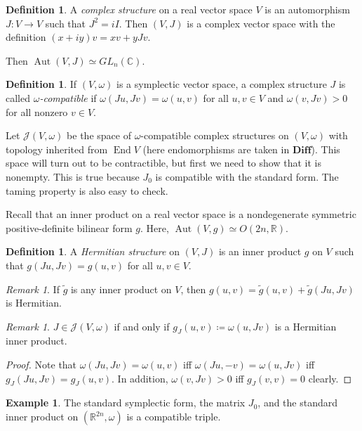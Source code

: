 \documentclass[leqno, openany]{memoir}
\theoremstyle{definition}
\newtheorem{defn}[thm]{Definition}
\newtheorem{exm}[thm]{Example}
\theoremstyle{remark}
\newtheorem{rmk}[thm]{Remark}
\theoremstyle{plain}
\theoremstyle{definition}
\theoremstyle{remark}
\newcommand{\R}{\mathbb{R}}
\newcommand{\C}{\mathbb{C}}
\newcommand{\mc}[1]{\mathcal{#1}}
\DeclareMathOperator{\End}{End}
\DeclareMathOperator{\Aut}{Aut}
\begin{document}
\begin{defn} A \textit{complex structure} on a real vector space $V$ is an
automorphism $J: V \to V$ such that $J^2 = iI$. Then $(V, J)$ is a complex
vector space with the definition $(x+iy) v = x v + yJv$.  \end{defn} Then
$\Aut(V, J) \simeq GL_n(\C)$.

\begin{defn} If $(V, \omega)$ is a symplectic vector space, a complex structure
$J$ is called \textit{$\omega$-compatible} if $\omega(Ju, Jv) = \omega(u,v)$
for all $u,v \in V$ and $\omega(v, Jv) > 0$ for all nonzero $v \in V$.
\end{defn} Let $\mc{J}(V, \omega)$ be the space of $\omega$-compatible complex
structures on $(V, \omega)$ with topology inherited from $\End V$ (here
endomorphisms are taken in $\mathbf{Diff}$). This space will turn out to be
contractible, but first we need to show that it is nonempty. This is true
because $J_0$ is compatible with the standard form. The taming property is also
easy to check.

Recall that an inner product on a real vector space is a nondegenerate
symmetric positive-definite bilinear form $g$. Here, $\Aut(V,g) \simeq O(2n,
\R)$.  \begin{defn} A \textit{Hermitian structure} on $(V,J)$ is an inner
    product $g$ on $V$ such that $g(Ju, Jv) = g(u, v)$ for all $u,v \in V$.
\end{defn}

\begin{rmk} If $\widetilde{g}$ is any inner product on $V$, then $g(u,v) =
\widetilde{g}(u,v) + \widetilde{g}(Ju,Jv)$ is Hermitian.  \end{rmk}

\begin{rmk} $J \in \mc{J}(V, \omega)$ if and only if $g_J(u,v) \coloneqq
\omega(u, Jv)$ is a Hermitian inner product.  \end{rmk}

\begin{proof} Note that $\omega(Ju, Jv) = \omega(u,v)$ iff $\omega(Ju, -v) =
\omega(u, Jv)$ iff $g_J(Ju, Jv) = g_J(u,v)$. In addition, $\omega(v, Jv) > 0$
iff $g_J(v,v) = 0$ clearly.  \end{proof}

\begin{exm} The standard symplectic form, the matrix $J_0$, and the standard
inner product on $(\R^{2n}, \omega)$ is a compatible triple.  \end{exm}
\end{document}
